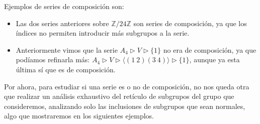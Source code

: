 \begin{ejemplo}
    Ejemplos de series de composición son:
    \begin{itemize}
        \item Las dos series anteriores sobre $\mathbb{Z}/24\mathbb{Z}$ son series de composición, ya que los índices no permiten introducir más subgrupos a la serie.
        \item Anteriormente vimos que la serie $A_4 \rhd V \rhd \{1\}$ no era de composición, ya que podíamos refinarla más: $A_4 \rhd V \rhd \langle (1\ 2)(3\ 4) \rangle \rhd \{1\} $, aunque ya esta última sí que es de composición.
    \end{itemize}
    Por ahora, para estudiar si una serie es o no de composición, no nos queda otra que realizar un análisis exhaustivo del retículo de subgrupos del grupo que consideremos, analizando solo las inclusiones de subgrupos que sean normales, algo que mostraremos en los siguientes ejemplos.
\end{ejemplo}

